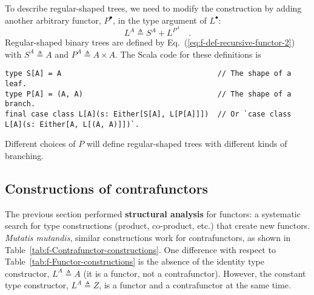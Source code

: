 To describe regular-shaped trees, we need to modify the construction
by adding another arbitrary functor, $P^{\bullet}$, in the type argument
of $L^{\bullet}$:
\begin{equation}
L^{A}\triangleq S^{A}+L^{P^{A}}\quad.\label{eq:f-def-recursive-functor-2}
\end{equation}
Regular-shaped binary trees are defined by Eq.~(\ref{eq:f-def-recursive-functor-2})
with $S^{A}\triangleq A$ and $P^{A}\triangleq A\times A$. The Scala
code for these definitions is
\begin{lstlisting}
type S[A] = A                                    // The shape of a leaf.
type P[A] = (A, A)                               // The shape of a branch.
final case class L[A](s: Either[S[A], L[P[A]]])  // Or `case class L[A](s: Either[A, L[(A, A)]])`.
\end{lstlisting}
Different choices of $P$ will define regular-shaped trees with different
kinds of branching.

\subsection{Constructions of contrafunctors\label{subsec:f-Contrafunctor-constructions}}

The previous section performed \textbf{structural analysis}
for functors: a systematic search for type constructions (product,
co-product, etc.) that create new functors.\emph{ Mutatis mutandis},
similar constructions work for contrafunctors, as shown in Table~\ref{tab:f-Contrafunctor-constructions}.
One difference with respect to Table~\ref{tab:f-Functor-constructions}
is the absence of the identity type constructor, $L^{A}\triangleq A$
(it is a functor, not a contrafunctor). However, the constant type
constructor, $L^{A}\triangleq Z$, is a functor and a contrafunctor
at the same time.

